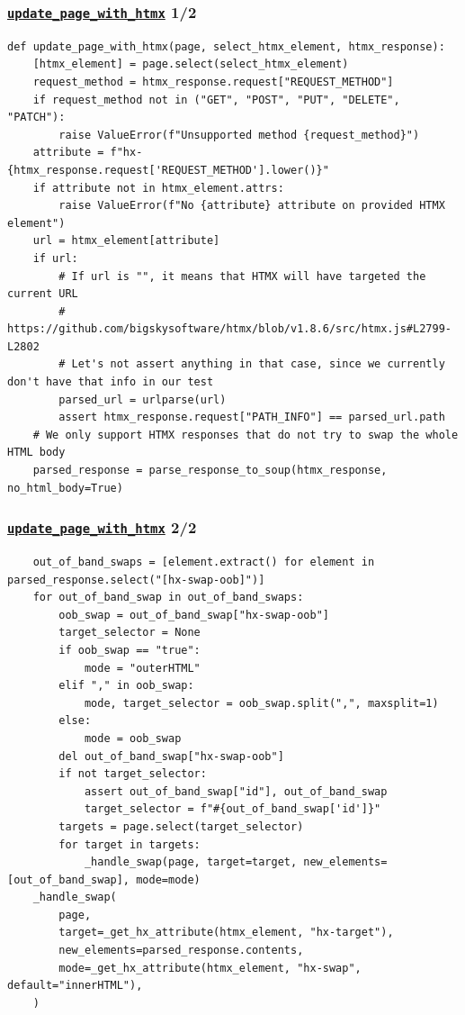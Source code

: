 \documentclass{beamer}
\begin{document}
\begin{frame}[fragile]
    \frametitle{\href{https://github.com/gip-inclusion/les-emplois/blob/9d800e6b3c8a814f17303157966830a0411db8e5/tests/utils/htmx/test.py\#L64}{\texttt{update\_page\_with\_htmx}} \hfill 1/2}
    \begin{verbatim}
def update_page_with_htmx(page, select_htmx_element, htmx_response):
    [htmx_element] = page.select(select_htmx_element)
    request_method = htmx_response.request["REQUEST_METHOD"]
    if request_method not in ("GET", "POST", "PUT", "DELETE", "PATCH"):
        raise ValueError(f"Unsupported method {request_method}")
    attribute = f"hx-{htmx_response.request['REQUEST_METHOD'].lower()}"
    if attribute not in htmx_element.attrs:
        raise ValueError(f"No {attribute} attribute on provided HTMX element")
    url = htmx_element[attribute]
    if url:
        # If url is "", it means that HTMX will have targeted the current URL
        # https://github.com/bigskysoftware/htmx/blob/v1.8.6/src/htmx.js#L2799-L2802
        # Let's not assert anything in that case, since we currently don't have that info in our test
        parsed_url = urlparse(url)
        assert htmx_response.request["PATH_INFO"] == parsed_url.path
    # We only support HTMX responses that do not try to swap the whole HTML body
    parsed_response = parse_response_to_soup(htmx_response, no_html_body=True)
    \end{verbatim}
\end{frame}

\begin{frame}[fragile]
    \frametitle{\href{https://github.com/gip-inclusion/les-emplois/blob/9d800e6b3c8a814f17303157966830a0411db8e5/tests/utils/htmx/test.py\#L64}{\texttt{update\_page\_with\_htmx}} \hfill 2/2}
    \begin{verbatim}
    out_of_band_swaps = [element.extract() for element in parsed_response.select("[hx-swap-oob]")]
    for out_of_band_swap in out_of_band_swaps:
        oob_swap = out_of_band_swap["hx-swap-oob"]
        target_selector = None
        if oob_swap == "true":
            mode = "outerHTML"
        elif "," in oob_swap:
            mode, target_selector = oob_swap.split(",", maxsplit=1)
        else:
            mode = oob_swap
        del out_of_band_swap["hx-swap-oob"]
        if not target_selector:
            assert out_of_band_swap["id"], out_of_band_swap
            target_selector = f"#{out_of_band_swap['id']}"
        targets = page.select(target_selector)
        for target in targets:
            _handle_swap(page, target=target, new_elements=[out_of_band_swap], mode=mode)
    _handle_swap(
        page,
        target=_get_hx_attribute(htmx_element, "hx-target"),
        new_elements=parsed_response.contents,
        mode=_get_hx_attribute(htmx_element, "hx-swap", default="innerHTML"),
    )
    \end{verbatim}
\end{frame}
\end{document}

